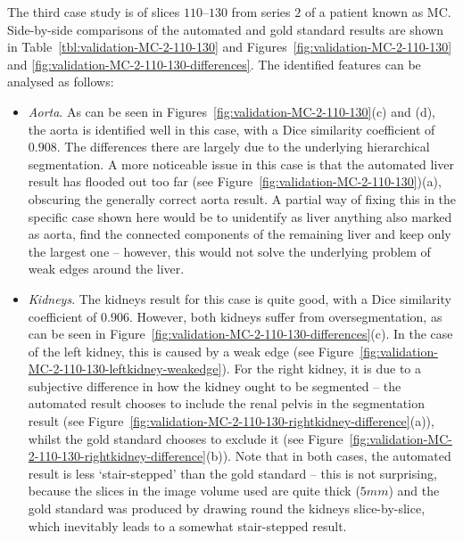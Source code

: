 The third case study is of slices $110$--$130$ from series $2$ of a patient known as MC. Side-by-side comparisons of the automated and gold standard results are shown in Table~\ref{tbl:validation-MC-2-110-130} and Figures~\ref{fig:validation-MC-2-110-130} and \ref{fig:validation-MC-2-110-130-differences}. The identified features can be analysed as follows:
%
\begin{itemize}

\item \emph{Aorta}. As can be seen in Figures~\ref{fig:validation-MC-2-110-130}(c) and (d), the aorta is identified well in this case, with a Dice similarity coefficient of $0.908$. The differences there are largely due to the underlying hierarchical segmentation. A more noticeable issue in this case is that the automated liver result has flooded out too far (see Figure~\ref{fig:validation-MC-2-110-130})(a), obscuring the generally correct aorta result. A partial way of fixing this in the specific case shown here would be to unidentify as liver anything also marked as aorta, find the connected components of the remaining liver and keep only the largest one -- however, this would not solve the underlying problem of weak edges around the liver.

\item \emph{Kidneys}. The kidneys result for this case is quite good, with a Dice similarity coefficient of $0.906$. However, both kidneys suffer from oversegmentation, as can be seen in Figure~\ref{fig:validation-MC-2-110-130-differences}(c). In the case of the left kidney, this is caused by a weak edge (see Figure~\ref{fig:validation-MC-2-110-130-leftkidney-weakedge}). For the right kidney, it is due to a subjective difference in how the kidney ought to be segmented -- the automated result chooses to include the renal pelvis in the segmentation result (see Figure~\ref{fig:validation-MC-2-110-130-rightkidney-difference}(a)), whilst the gold standard chooses to exclude it (see Figure~\ref{fig:validation-MC-2-110-130-rightkidney-difference}(b)). Note that in both cases, the automated result is less `stair-stepped' than the gold standard -- this is not surprising, because the slices in the image volume used are quite thick ($5\mathit{mm}$) and the gold standard was produced by drawing round the kidneys slice-by-slice, which inevitably leads to a somewhat stair-stepped result.


\end{itemize}
